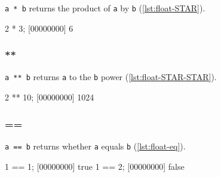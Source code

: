 \lstinline|a * b| returns the product of \lstinline|a| by
\lstinline|b| (\autoref{lst:float-STAR}).

\begin{urbiscript}[caption=Float.'*', label=lst:float-STAR]
2 * 3;
[00000000] 6
\end{urbiscript}

\subsubsection{**}

\lstinline|a ** b| returns \lstinline|a| to the \lstinline|b| power
(\autoref{lst:float-STAR-STAR}).

\begin{urbiscript}[caption=Float.'**', label=lst:float-STAR-STAR]
2 ** 10;
[00000000] 1024
\end{urbiscript}

\subsubsection{==}

\lstinline|a == b| returns whether \lstinline|a| equals \lstinline|b|
(\autoref{lst:float-eq}).

\begin{urbiscript}[caption={Float.'=='}, label=lst:float-eq]
1 == 1;
[00000000] true
1 == 2;
[00000000] false
\end{urbiscript}



